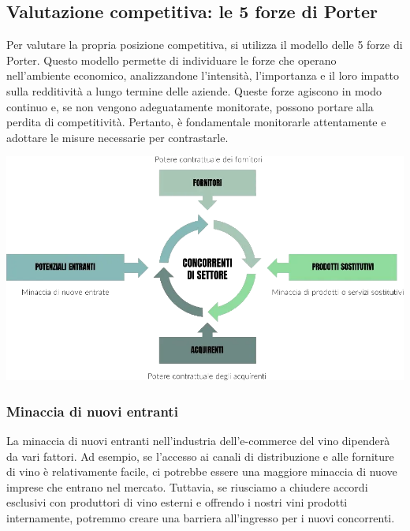 \documentclass[12pt, a4paper]{article}
\begin{document}
\subsection{Valutazione competitiva: le 5 forze di Porter}
Per valutare la propria posizione competitiva, si utilizza il modello delle 5 forze di Porter. Questo modello permette di individuare le forze che operano nell'ambiente economico, analizzandone l'intensità, l'importanza e il loro impatto sulla redditività a lungo termine delle aziende. Queste forze agiscono in modo continuo e, se non vengono adeguatamente monitorate, possono portare alla perdita di competitività. Pertanto, è fondamentale monitorarle attentamente e adottare le misure necessarie per contrastarle.
\begin{center}
    \includegraphics[width=\textwidth]{images/5-forze-di-porter.png}
\end{center}


\subsubsection{Minaccia di nuovi entranti}
La minaccia di nuovi entranti nell'industria dell'e-commerce del vino dipenderà da vari fattori. Ad esempio, se l'accesso ai canali di distribuzione e alle forniture di vino è relativamente facile, ci potrebbe essere una maggiore minaccia di nuove imprese che entrano nel mercato. Tuttavia, se riusciamo a chiudere accordi esclusivi con produttori di vino esterni e offrendo i nostri vini prodotti internamente, potremmo creare una barriera all'ingresso per i nuovi concorrenti.
\end{document}
